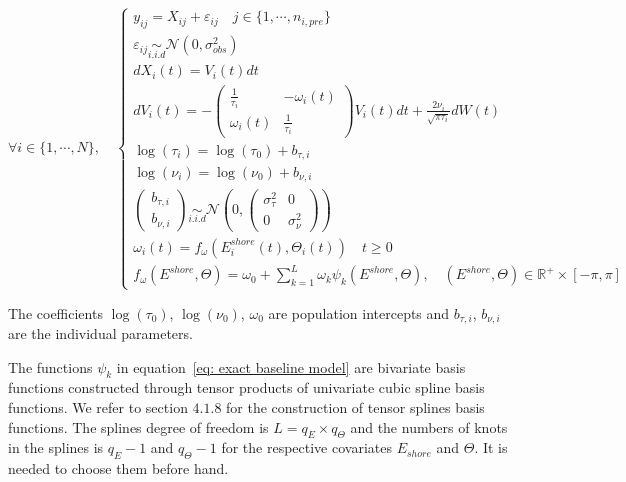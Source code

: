 \documentclass[11pt]{article}
\newcommand {\R}{\mathbb{R}}
\newcommand {\1}{\mathbb{1}}
\theoremstyle{definition}
\theoremstyle{remark}
\theoremstyle{remark}
\begin{document}
\begin{equation}  \forall i \in \{1,\cdots,N\}, \quad \left\{
	\begin{array}{l}
		y_{ij}=X_{ij}+\varepsilon_{ij} \quad j \in \{1,\cdots,n_{i,pre}\}\\
		\varepsilon_{ij} \underset{i.i.d}{\sim} \mathcal{N}(0,\sigma_{obs}^2)  \\
		dX_i(t)=V_i(t)dt  \\
		dV_i(t)=-\begin{pmatrix} 
			\frac{1}{\tau_i} & -\omega_i(t) \\
			\omega_i(t) & \frac{1}{\tau_i}
		\end{pmatrix}V_i(t)dt+\frac{2\nu_i}{\sqrt{\pi \tau_i}} dW(t) \\
		\log(\tau_i)=\log(\tau_0)+b_{\tau,i}\\
		\log(\nu_i)=\log(\nu_0)+b_{\nu,i}  \\
		\begin{pmatrix} b_{\tau,i} \\ b_{\nu,i} \end{pmatrix} \underset{i.i.d}{\sim} \mathcal{N}\left(0,\begin{pmatrix} \sigma_{\tau}^2 & 0 \\ 0 & \sigma_{\nu}^2 \end{pmatrix}\right) \\
		\omega_i(t)=f_{\omega}(E^{shore}_i(t),\Theta_i(t)) \quad t \geq 0\\
		f_{\omega}(E^{shore},\Theta)=\omega_{0}+\sum_{k=1}^{L} \omega_{k} \psi_k(E^{shore},\Theta), \quad (E^{shore},\Theta) \in \R^+ \times [-\pi,\pi]
	\end{array}
	\right.
	\label{eq: exact baseline model}
\end{equation}



The coefficients $\log(\tau_{0})$, $\log(\nu_{0})$, $\omega_{0}$ are population intercepts and $b_{\tau,i}$, $b_{\nu,i}$
are the individual parameters. 

The functions $\psi_k$ in equation~\ref{eq: exact baseline model} are bivariate basis functions constructed through tensor products of univariate cubic spline basis functions. We refer to \cite{wood_generalized_2017} section $4.
1.8$ for the construction of tensor splines basis functions. The splines degree of freedom is $L=q_E \times q_{\Theta}$ and the numbers of knots in the splines is $q_E-1$ and $q_{\Theta}-1$ for the respective covariates $E_{shore}$ and $\Theta$. It is needed to choose them before hand.\\
\end{document}
